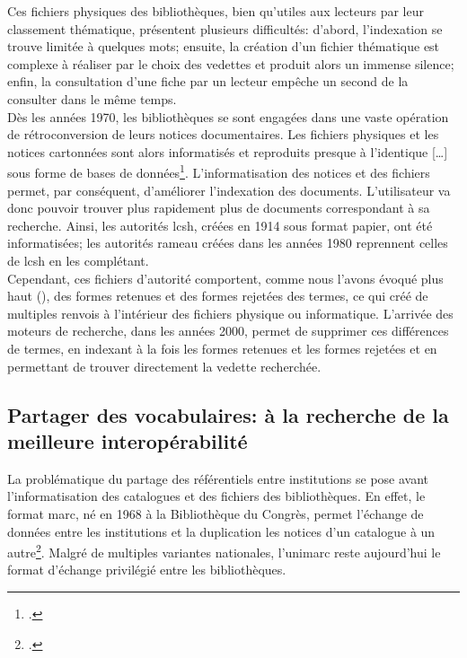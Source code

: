 Ces fichiers physiques des bibliothèques, bien qu'utiles aux lecteurs par leur classement thématique, présentent plusieurs difficultés: d'abord, l'indexation se trouve limitée à quelques mots; ensuite, la création d'un fichier thématique est complexe à réaliser par le choix des vedettes et produit alors un immense silence; enfin, la consultation d'une fiche par un lecteur empêche un second de la consulter dans le même temps.\\

Dès les années 1970, les bibliothèques se sont engagées dans une vaste opération de rétroconversion de leurs notices documentaires. Les fichiers physiques et les notices cartonnées sont alors informatisés et \og reproduits presque à l’identique [\dots] sous forme de bases de données\fg{}\footcite{bermes_du_2013}. L'informatisation des notices et des fichiers permet, par conséquent, d'améliorer l'indexation des documents. L'utilisateur va donc pouvoir trouver plus rapidement plus de documents correspondant à sa recherche. Ainsi, les autorités \ac{lcsh}, créées en 1914 sous format papier, ont été informatisées; les autorités \ac{rameau} créées dans les années 1980 reprennent celles de \ac{lcsh} en les complétant.\\

Cependant, ces fichiers d'autorité comportent, comme nous l'avons évoqué plus haut (), des formes retenues et des formes rejetées des termes, ce qui créé de multiples renvois à l'intérieur des fichiers physique ou informatique. L'arrivée des moteurs de recherche, dans les années 2000, permet de supprimer ces différences de termes, en indexant à la fois les formes retenues et les formes rejetées et en permettant de trouver directement la vedette recherchée.

\subsection{\label{I-A-3-b}Partager des vocabulaires: à la recherche de la meilleure interopérabilité}

La problématique du partage des référentiels entre institutions se pose avant l'informatisation des catalogues et des fichiers des bibliothèques. En effet, le format \ac{marc}, né en 1968 à la Bibliothèque du Congrès, permet l'échange de données entre les institutions et la \og duplication les notices d’un catalogue à un autre\fg{}\footcite{bermes_convergence_2013}. Malgré de multiples variantes nationales, l'\ac{unimarc} reste aujourd'hui le format d'échange privilégié entre les bibliothèques.\\

